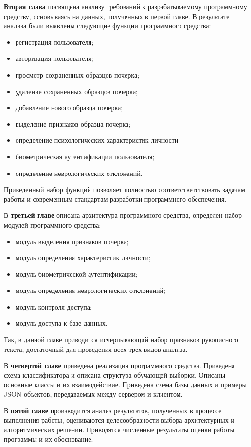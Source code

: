 \textbf{Вторая глава} посвящена анализу требований к разрабатываемому программному средству, основываясь на данных, полученных в первой главе. В результате анализа были выявлены следующие функции программного средства:
\begin{itemize}
	\item регистрация пользователя;
	\item авторизация пользователя;
	\item просмотр сохраненных образцов почерка;
	\item удаление сохраненных образцов почерка;
	\item добавление нового образца почерка;
	\item выделение признаков образца почерка;
	\item определение психологических характеристик личности;
	\item биометрическая аутентификации пользователя;
	\item определение неврологических отклонений.
\end{itemize}

Приведенный набор функций позволяет полностью соответстветствовать задачам работы и современным стандартам разработки программного обеспечения.

В \textbf{третьей главе} описана архитектура программного средства, определен набор модулей программного средства:
\begin{itemize}
    \item модуль выделения признаков почерка;
    \item модуль определения характеристик личности;
    \item модуль биометрической аутентификации;
    \item модуль определения неврологических отклонений;
    \item модуль контроля доступа;
    \item модуль доступа к базе данных.
\end{itemize}

Так, в данной главе приводится исчерпывающий набор признаков рукописного текста, достаточный для проведения всех трех видов анализа.

В \textbf{четвертой главе} приведена реализация программного средства. Приведена схема классификатора и описана структура обучающей выборки. Описаны основные классы и их взаимодействие. Приведена схема базы данных и примеры JSON-объектов, передаваемых между сервером и клиентом.

В \textbf{пятой главе} производится анализ результатов, полученных в процессе выполнения работы, оцениваются целесообразности выбора архитектурных и алгоритмических решений. Приводятся численные результаты оценки работы программы и их обоснование.

